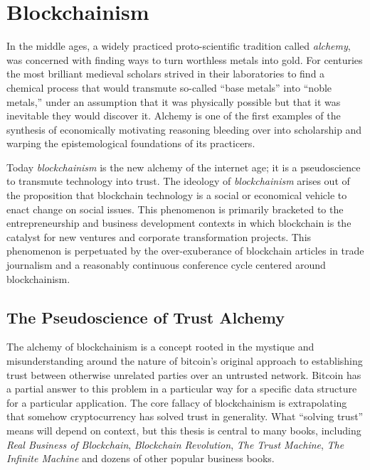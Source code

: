 \chapter{Blockchainism}


In the middle ages, a widely practiced proto-scientific tradition called
\textit{alchemy}, was concerned with finding ways to turn worthless metals into
gold. For centuries the most brilliant medieval scholars strived in their
laboratories to find a chemical process that would transmute so-called ``base
metals'' into ``noble metals,'' under an assumption that it was physically
possible but that it was inevitable they would discover it. Alchemy is one of
the first examples of the synthesis of economically motivating reasoning
bleeding over into scholarship and warping the epistemological foundations of
its practicers.


Today \textit{blockchainism} is the new alchemy of the internet age; it is a
pseudoscience to transmute technology into trust. The ideology of
\textit{blockchainism} arises out of the proposition that blockchain technology
is a social or economical vehicle to enact change on social issues. This
phenomenon is primarily bracketed to the entrepreneurship and business
development contexts in which blockchain is the catalyst for new ventures and
corporate transformation projects. This phenomenon is perpetuated by the
over-exuberance of blockchain articles in trade journalism and a reasonably
continuous conference cycle centered around blockchainism.


\section{The Pseudoscience of Trust Alchemy}

The alchemy of blockchainism is a concept rooted in the mystique and
misunderstanding around the nature of bitcoin's original approach to
establishing trust between otherwise unrelated parties over an untrusted
network. Bitcoin has a partial answer to this problem in a particular way for a
specific data structure for a particular application. The core fallacy of
blockchainism is extrapolating that somehow cryptocurrency has solved trust in
generality. What ``solving trust'' means will depend on context, but this thesis
is central to many books, including \textit{Real Business of Blockchain},
\textit{Blockchain Revolution}, \textit{The Trust Machine}, \textit{The Infinite
Machine} and dozens of other popular business books.
\cite{jeffries_blockchain_2018}

